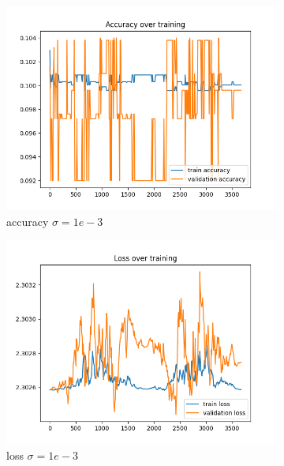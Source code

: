 \documentclass[a4paper]{article}
\begin{document}
\begin{figure}[h]
	\begin{subfigure}{0.3\textwidth}
		\centering
		\includegraphics[width=\linewidth]{images/sens_sigma_0.001_use_bn_False_acc.png}
		\caption{accuracy $\sigma=1e-3$}
	\end{subfigure}
	\begin{subfigure}{0.3\textwidth}
		\centering
		\includegraphics[width=\linewidth]{images/sens_sigma_0.001_use_bn_False_loss.png}
		\caption{loss $\sigma=1e-3$}
	\end{subfigure}
	\begin{subfigure}{0.3\textwidth}
		\centering

\end{subfigure}
\end{figure}
\end{document}

